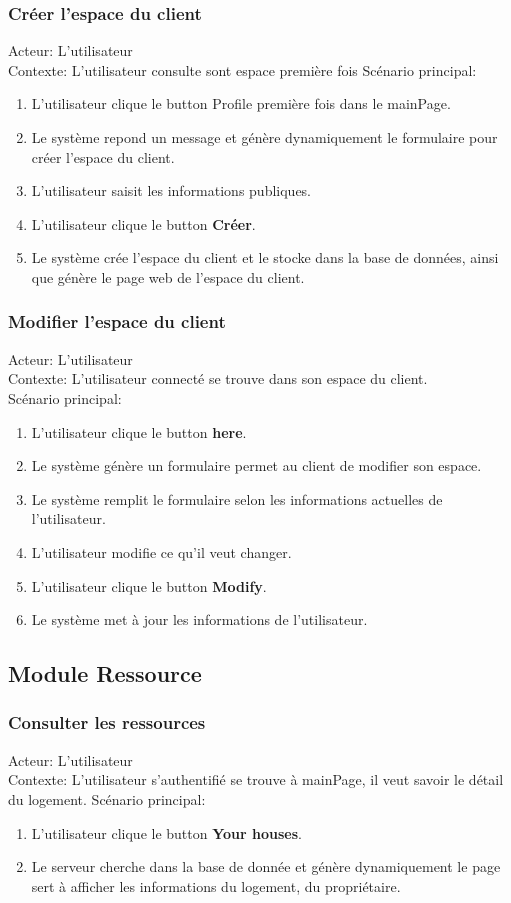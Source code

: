 \documentclass[14px]{article}
\begin{document}
\subsubsection{Créer l'espace du client}
Acteur: L'utilisateur\\
Contexte: L'utilisateur consulte sont espace première fois
Scénario principal:
\begin{enumerate}
	\item L'utilisateur clique le button Profile première fois dans le mainPage.
	\item Le système repond un message et génère dynamiquement le formulaire pour créer l'espace du client.
	\item L'utilisateur saisit les informations publiques.
	\item L'utilisateur clique le button \textbf{Créer}.
	\item Le système crée l'espace du client et le stocke dans la base de données, ainsi que génère le page web de l'espace du client.
\end{enumerate}

\subsubsection{Modifier l'espace du client}
Acteur: L'utilisateur\\
Contexte: L'utilisateur connecté se trouve dans son espace du client.\\
Scénario principal:
\begin{enumerate}
	\item L'utilisateur clique le button \textbf{here}.
	\item Le système génère un formulaire permet au client de modifier son espace.
	\item Le système remplit le formulaire selon les informations actuelles de l'utilisateur.
	\item L'utilisateur modifie ce qu'il veut changer.
	\item L'utilisateur clique le button \textbf{Modify}.
	\item Le système met à jour les informations de l'utilisateur.
\end{enumerate}

\subsection{Module Ressource}
\subsubsection{Consulter les ressources}
Acteur: L'utilisateur\\
Contexte: L'utilisateur s'authentifié se trouve à mainPage, il veut savoir le détail du logement.
Scénario principal:
\begin{enumerate}
	\item L'utilisateur clique le button \textbf{Your houses}.
	\item Le serveur cherche dans la base de donnée et génère dynamiquement le page sert à afficher les informations du logement, du propriétaire. 
\end{enumerate}
\end{document}
